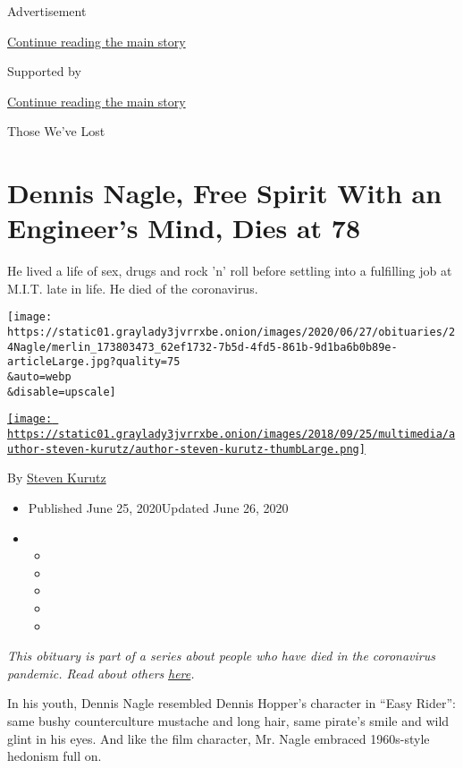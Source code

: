 Advertisement

\protect\hyperlink{after-top}{Continue reading the main story}

Supported by

\protect\hyperlink{after-sponsor}{Continue reading the main story}

Those We've Lost

\hypertarget{dennis-nagle-free-spirit-with-an-engineers-mind-dies-at-78}{%
\section{Dennis Nagle, Free Spirit With an Engineer's Mind, Dies at
78}\label{dennis-nagle-free-spirit-with-an-engineers-mind-dies-at-78}}

He lived a life of sex, drugs and rock 'n' roll before settling into a
fulfilling job at M.I.T. late in life. He died of the coronavirus.

\texttt{[image: https://static01.graylady3jvrrxbe.onion/images/2020/06/27/obituaries/24Nagle/merlin\_173803473\_62ef1732-7b5d-4fd5-861b-9d1ba6b0b89e-articleLarge.jpg?quality=75\\\&auto=webp\\\&disable=upscale]}

\href{https://www.nytimes3xbfgragh.onion/by/steven-kurutz}{\texttt{[image: https://static01.graylady3jvrrxbe.onion/images/2018/09/25/multimedia/author-steven-kurutz/author-steven-kurutz-thumbLarge.png]}}

By \href{https://www.nytimes3xbfgragh.onion/by/steven-kurutz}{Steven
Kurutz}

\begin{itemize}
\item
  Published June 25, 2020Updated June 26, 2020
\item
  \begin{itemize}
  \item
  \item
  \item
  \item
  \item
  \end{itemize}
\end{itemize}

\emph{This obituary is part of a series about people who have died in
the coronavirus pandemic. Read about others}
\href{https://www.nytimes3xbfgragh.onion/interactive/2020/obituaries/people-died-coronavirus-obituaries.html}{\emph{here}}\emph{.}

In his youth, Dennis Nagle resembled Dennis Hopper's character in ``Easy
Rider'': same bushy counterculture mustache and long hair, same pirate's
smile and wild glint in his eyes. And like the film character, Mr. Nagle
embraced 1960s-style hedonism full on.

